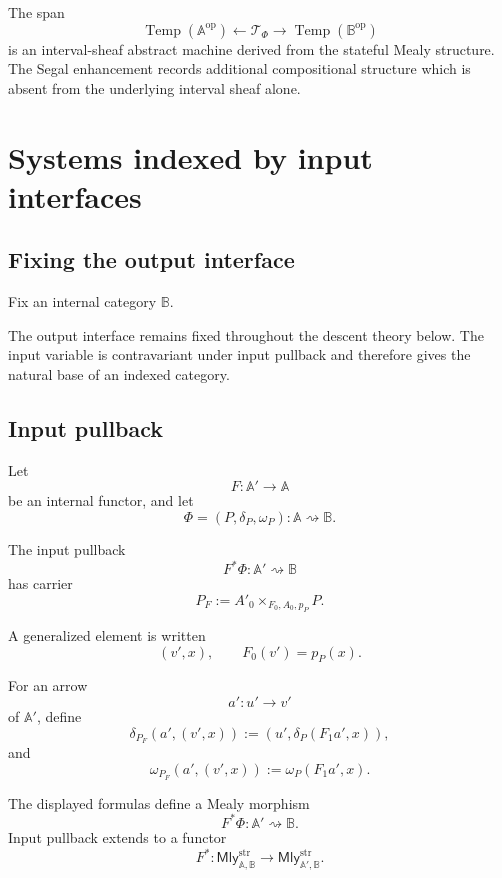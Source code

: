 \begin{remark}
\label{rem:temporal-abstract-machine}
The span
\[
    \operatorname{Temp}(\mathbb A^{\mathrm{op}})
    \longleftarrow
    \mathscr T_\Phi
    \longrightarrow
    \operatorname{Temp}(\mathbb B^{\mathrm{op}})
\]
is an interval-sheaf abstract machine derived from the stateful Mealy
structure. The Segal enhancement records additional compositional structure
which is absent from the underlying interval sheaf alone.
\end{remark}

\section{Systems indexed by input interfaces}
\label{sec:systems-indexed-input-interfaces}

\subsection{Fixing the output interface}
\label{subsec:fixing-output-interface}

Fix an internal category \(\mathbb B\).

The output interface remains fixed throughout the descent theory below. The
input variable is contravariant under input pullback and therefore gives the
natural base of an indexed category.

\subsection{Input pullback}
\label{subsec:input-pullback-systems}

Let
\[
    F:\mathbb A'\to\mathbb A
\]
be an internal functor, and let
\[
    \Phi=(P,\delta_P,\omega_P):
    \mathbb A\rightsquigarrow\mathbb B.
\]

The input pullback
\[
    F^\ast\Phi:
    \mathbb A'\rightsquigarrow\mathbb B
\]
has carrier
\[
    P_F
    :=
    A'_0\times_{F_0,A_0,p_P}P.
\]

A generalized element is written
\[
    (v',x),
    \qquad
    F_0(v')=p_P(x).
\]

For an arrow
\[
    a':u'\to v'
\]
of \(\mathbb A'\), define
\[
    \delta_{P_F}(a',(v',x))
    :=
    \left(
    u',
    \delta_P(F_1a',x)
    \right),
\]
and
\[
    \omega_{P_F}(a',(v',x))
    :=
    \omega_P(F_1a',x).
\]

\begin{proposition}
\label{prop:input-pullback-systems}
The displayed formulas define a Mealy morphism
\[
    F^\ast\Phi:
    \mathbb A'\rightsquigarrow\mathbb B.
\]
Input pullback extends to a functor
\[
    F^\ast:
    \mathsf{Mly}^{\mathrm{str}}_{\mathbb A,\mathbb B}
    \to
    \mathsf{Mly}^{\mathrm{str}}_{\mathbb A',\mathbb B}.
\]
\end{proposition}

